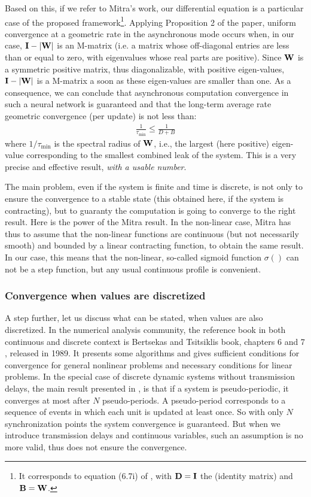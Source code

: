 Based on this, if we refer to Mitra's work, our differential equation is a particular case of the proposed framework\footnote{It corresponds to equation (6.7i) of \cite{Mitra:1987}, with ${\bf D} = {\bf I}$ the (identity matrix) and ${\bf B} = {\bf W}$.}. Applying Proposition 2 of the paper, uniform convergence at a geometric rate in the asynchronous mode occurs when, in our case, ${\bf I} - |{\bf W}|$ is an M-matrix (i.e. a matrix whose off-diagonal entries are less than or equal to zero, with eigenvalues whose real parts are positive).
Since ${\bf W}$ is a symmetric positive matrix, thus diagonalizable, with positive eigen-values, ${\bf I} - |{\bf W}|$ is a M-matrix a soon as these eigen-values are smaller than one.
As a consequence, we can conclude that asynchronous computation convergence in such a neural network is guaranteed and that the long-term average rate geometric convergence (per update) is not less than:
\begin{align}
\label{eq:convergence}
\frac{1}{\tau_{\min}} \leq \frac{1}{D + B}
\end{align}
where $1/\tau_{\min}$ is the spectral radius of ${\bf W}$, i.e., the largest (here positive) eigen-value corresponding to the smallest combined leak of the system. This is a very precise and effective result, {\em with a usable number}.

The main problem, even if the system is finite and time is discrete, is not only to ensure the convergence to a stable state (this obtained here, if the system is contracting), but to guaranty the computation is going to converge to the right result. Here is the power of the Mitra result. In the non-linear case, Mitra has thus to assume that the non-linear functions are continuous (but not necessarily smooth) and bounded by a linear contracting function, to obtain the same result. In our case, this means that the non-linear, so-called sigmoid function $\sigma()$ can not be a step function, but any usual continuous profile is convenient.

\subsubsection*{Convergence when values are discretized}

A step further, let us discuss what can be stated, when values are also discretized.
In the numerical analysis community, the  reference book in both continuous and discrete context is Bertsekas and Tsitsiklis book, 
chapters 6 and 7 \cite{Bertsekas:1997}, released in 1989. It presents some algorithms and gives sufficient conditions for convergence for general nonlinear problems and necessary conditions for linear problems. 
In the special case of discrete dynamic systems without transmission delays, the main result presented in \cite{Robert:1994,Bahi:2002}, is that if a system is pseudo-periodic, it converges at most after $N$ pseudo-periods. A pseudo-period corresponds to a sequence of events in which each unit is updated at least once. So with only $N$ synchronization points the system convergence is guaranteed. 
But when we introduce transmission delays and continuous variables, such an assumption is no more valid, thus does not ensure the convergence. 


